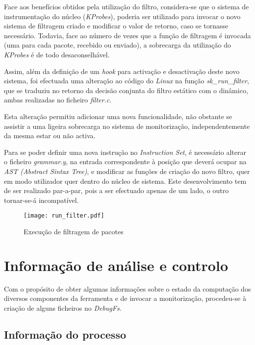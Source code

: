 Face aos benefícios obtidos pela utilização do filtro, considera-se que o sistema de instrumentação do núcleo (\textit{KProbes}), poderia ser utilizado para invocar o novo sistema de filtragem criado e modificar o valor de retorno, caso se tornasse necessário.
Todavia, face ao número de vezes que a função de filtragem é invocada (uma para cada pacote, recebido ou enviado), a sobrecarga da utilização do \textit{KProbes} é de todo desaconselhável.

Assim, além da definição de um \textit{hook} para activação e desactivação deste novo sistema, foi efectuada uma alteração ao código do \textit{Linux} na função \textit{sk\_run\_filter}, que se traduziu no retorno da decisão conjunta do filtro estático com o dinâmico, ambas realizadas no ficheiro \textit{filter.c}.

Esta alteração permitiu adicionar uma nova funcionalidade, não obstante se assistir a uma ligeira sobrecarga no sistema de monitorização, independentemente da mesma estar ou não activa.


Para se poder definir uma nova instrução no \textit{Instruction Set}, é necessário alterar o ficheiro \textit{grammar.y}, na entrada correspondente à posição que deverá ocupar na \textit{AST (Abstract Sintax Tree)}, e modificar as funções de criação do novo filtro, quer em modo utilizador quer dentro do núcleo de sistema.
Este desenvolvimento tem de ser realizado par-a-par, pois a ser efectuado apenas de um lado, o outro tornar-se-á incompatível.


\begin{figure}[ht]
\centering
\texttt{[image: run\_filter.pdf]}
\caption{Execução de filtragem de pacotes}
\label{fig:run_filter}
\end{figure}

\section{Informação de análise e controlo}

Com o propósito de obter algumas informações sobre o estado da computação dos diversos componentes da ferramenta e de invocar a monitorização, procedeu-se à criação de alguns ficheiros no \textit{DebugFs}.


\subsection{Informação do processo}


